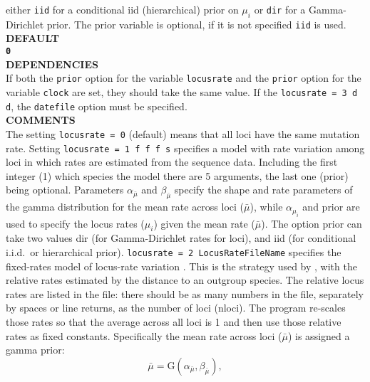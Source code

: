 \documentclass[11pt]{article}
\begin{document}
either \texttt{iid} for a conditional iid (hierarchical) prior on
$\mu_i$ or \texttt{dir} for a Gamma-Dirichlet prior. The prior
variable is optional, if it is not specified \texttt{iid} is used.
\vspace{5pt}\\
\textbf{DEFAULT} \vspace{5pt}\\
\textbf{\texttt{0}} \vspace{5pt}\\
\textbf{DEPENDENCIES} \vspace{5pt}\\
If both the \texttt{prior} option for the variable \texttt{locusrate}
and the \texttt{prior} option
for the variable \texttt{clock} are set, they should take the same value.  
If the \texttt{locusrate = 3 d d}, the \texttt{datefile} option must be specified. \vspace{5pt} \\
\textbf{COMMENTS} \vspace{5pt}\\
The setting \texttt{locusrate = 0} (default) means that all loci have
the same mutation rate.  Setting \texttt{locusrate = 1 f f f s}
specifies a model with rate variation among loci in which rates are
estimated from the sequence data.  Including the first integer (1)
which species the model there are 5 arguments, the last one (prior)
being optional.  Parameters $\alpha_{\bar{\mu}}$ and
$\beta_{\bar{\mu}}$ specify the shape and rate parameters of the gamma
distribution for the mean rate across loci ($\bar\mu$), while
$\alpha_{\mu_i}$ and prior are used to specify the locus rates
($\mu_i$) given the mean rate ($\bar\mu$). The option prior can take
two values dir (for Gamma-Dirichlet rates for loci), and iid (for
conditional i.i.d.\ or hierarchical prior).  \texttt{locusrate = 2
	LocusRateFileName} specifies the fixed-rates model of locus-rate
variation \citep{Burgess2008}.  This is the strategy used by
\citet{Yang2002}, with the relative rates estimated by the distance to
an outgroup species.  The relative locus rates are listed in the file:
there should be as many numbers in the file, separately by spaces or
line returns, as the number of loci (nloci).  The program re-scales
those rates so that the average across all loci is 1 and then use
those relative rates as fixed constants.  Specifically the mean rate
across loci ($\bar{\mu}$) is assigned a gamma prior:
\begin{displaymath}
	\bar{\mu} = \mathrm{G}(\alpha_{\bar{\mu}},\beta_{\bar{\mu}}),
\end{displaymath}
\end{document}
